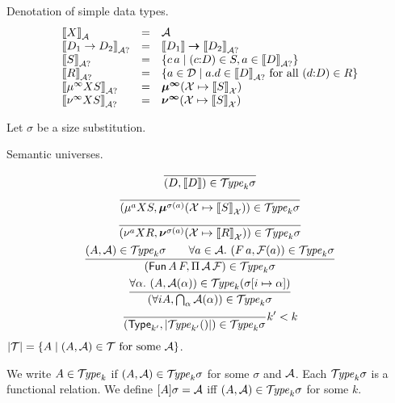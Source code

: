 \documentclass{article}
\begin{document}
Denotation of simple data types.
\[
\begin{array}{lll}
  \Den{X}{\A}
    & = & \A \\
  \Den{D_1 \to D_2}{\A?}
    & = & \den{D_1} \TO \DenA{D_2} \\
  \DenA{S}
    & = & \{ c\,a \mid (c{:}D) \in S, a \in \DenA D \} \\
  \DenA{R}
    & = & \{ a \in \D \mid a.d \in \DenA D \mforall (d{:}D) \in R \}
    \\
  \DenA{\muinf S} & = & \MUINF (\X \mapsto \Den{S}{\X}) \\
  \DenA{\nuinf S} & = & \NUINF (\X \mapsto \Den{S}{\X}) \\
\end{array}
\]

Let $\sigma$ be a size substitution.

Semantic universes.
\begin{gather*}
  \ru{
    }{\tyint D {\den D} k {\sigma}}
\\
  \ru{
    }{\tyint {\mu^a X S} {\MU^{\sigma(a)} (\X \mapsto \Den S \X)} k
      \sigma}
\\
  \ru{
    }{\tyint {\nu^a X R} {\NU^{\sigma(a)} (\X \mapsto \Den R \X)} k
      \sigma}
\\
  \ru{\tyint A \A k \sigma \qquad
      \forall a \in \A.\ \tyint {F\,a} {\F(a)} k \sigma
    }{\tyint{\Fun\,A\,F}{\PIAF} k \sigma}
\\
  \ru{\forall \alpha.\ \tyint A {\A(\alpha)} k {(\update \sigma i
      \alpha)}
    }{\tyint {\forall i A} {\bigcap_{\alpha} \A(\alpha)} k \sigma}
\\
   \ru{
     }{\tyint {\Type_{k'}} {|\TYPE_{k'}()|} {k} \sigma
     }{k' < k}
\end{gather*}
$|\mathcal{T}| = \{ A \mid (A,\mathcal{A}) \in \mathcal{T} \ \mbox{for some}\  \mathcal{A} \}$.

We write $A \in \mathcal{T}\!\mathit{ype}_k$ if $(A,\mathcal{A}) \in \mathcal{T}\!\mathit{ype}_k\sigma$ for some
$\sigma$ and $\mathcal{A}$.
Each $\mathcal{T}\!\mathit{ype}_k\sigma$ is a functional relation.
We define $[A]\sigma = \mathcal{A}$ iff $(A,\mathcal{A})\in\mathcal{T}\!\mathit{ype}_{k}{\sigma}$ for some $k$.
\end{document}
